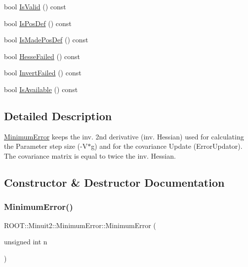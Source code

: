 \begin{DoxyCompactItemize}
bool \mbox{\hyperlink{classROOT_1_1Minuit2_1_1MinimumError_a0e9a9c525f7ac2e5dc5c7973056a852b}{Is\+Valid}} () const
\item 
bool \mbox{\hyperlink{classROOT_1_1Minuit2_1_1MinimumError_afffbed3fdd6785c959ca619a59aaaf74}{Is\+Pos\+Def}} () const
\item 
bool \mbox{\hyperlink{classROOT_1_1Minuit2_1_1MinimumError_addbc60edad85c271c20be5ff18678599}{Is\+Made\+Pos\+Def}} () const
\item 
bool \mbox{\hyperlink{classROOT_1_1Minuit2_1_1MinimumError_adf8acb6ea4137162b034eb6b9a79d9b9}{Hesse\+Failed}} () const
\item 
bool \mbox{\hyperlink{classROOT_1_1Minuit2_1_1MinimumError_ae9f212180703d5504c281f90efee263a}{Invert\+Failed}} () const
\item 
bool \mbox{\hyperlink{classROOT_1_1Minuit2_1_1MinimumError_af03638c23ec7b5573c139810cdb640c0}{Is\+Available}} () const
\end{DoxyCompactItemize}


\subsection{Detailed Description}
\mbox{\hyperlink{classROOT_1_1Minuit2_1_1MinimumError}{Minimum\+Error}} keeps the inv. 2nd derivative (inv. Hessian) used for calculating the Parameter step size (-\/V$\ast$g) and for the covariance Update (Error\+Updator). The covariance matrix is equal to twice the inv. Hessian. 

\subsection{Constructor \& Destructor Documentation}
\mbox{\label{classROOT_1_1Minuit2_1_1MinimumError_a4438a39dcecf1990ed8449d1bad58116}} 
\subsubsection{\texorpdfstring{MinimumError()}{MinimumError()}\hspace{0.1cm}{\footnotesize\ttfamily [1/21]}}
{\footnotesize\ttfamily R\+O\+O\+T\+::\+Minuit2\+::\+Minimum\+Error\+::\+Minimum\+Error (\begin{DoxyParamCaption}\item[{unsigned int}]{n }\end{DoxyParamCaption})\hspace{0.3cm}{\ttfamily [inline]}}

